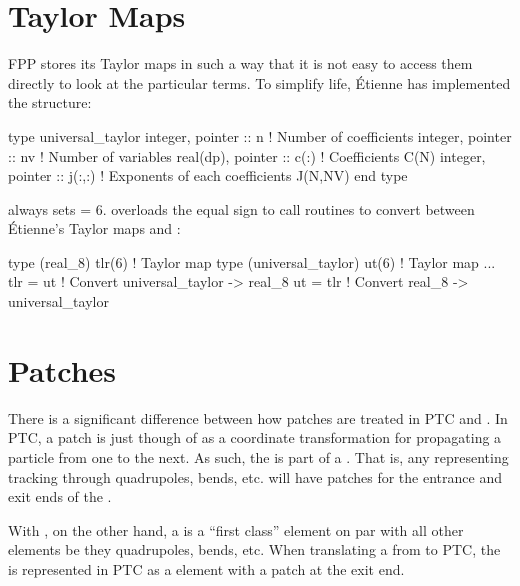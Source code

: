 {{{{{{\section{Taylor Maps}
\label{s:ptc.taylor}

FPP stores its  Taylor maps in such a way that it is not
easy to access them directly to look at the particular terms. To
simplify life, \'Etienne has implemented the
structure:
\begin{example}
  type universal_taylor
    integer, pointer  :: n       ! Number of coefficients
    integer, pointer  :: nv      ! Number of variables
    real(dp), pointer :: c(:)    ! Coefficients C(N)
    integer, pointer  :: j(:,:)  ! Exponents of each coefficients J(N,NV)
  end type
\end{example}
\bmad always sets  = 6. \bmad overloads the equal sign to call 
routines to convert between \'Etienne's
 Taylor maps and :
\begin{example}
  type (real_8) tlr(6)           ! Taylor map
  type (universal_taylor) ut(6)  ! Taylor map
  ...
  tlr = ut                       ! Convert universal_taylor -> real_8
  ut = tlr                       ! Convert real_8 -> universal_taylor
\end{example}

\section{Patches}
\label{s:ptc.patch}

There is a significant difference between how patches are treated in
PTC and \bmad.  In PTC, a patch is just though of as a coordinate
transformation for propagating a particle from one  to the
next. As such, the  is part of a . That is, any
 representing tracking through quadrupoles, bends, etc. will
have patches for the entrance and exit ends of the .

With \bmad, on the other hand, a  is a ``first class''
element on par with all other elements be they quadrupoles, bends,
etc. When translating a  from \bmad to PTC, the 
is represented in PTC as a  element with a patch at the
exit end.

}}}}}}
